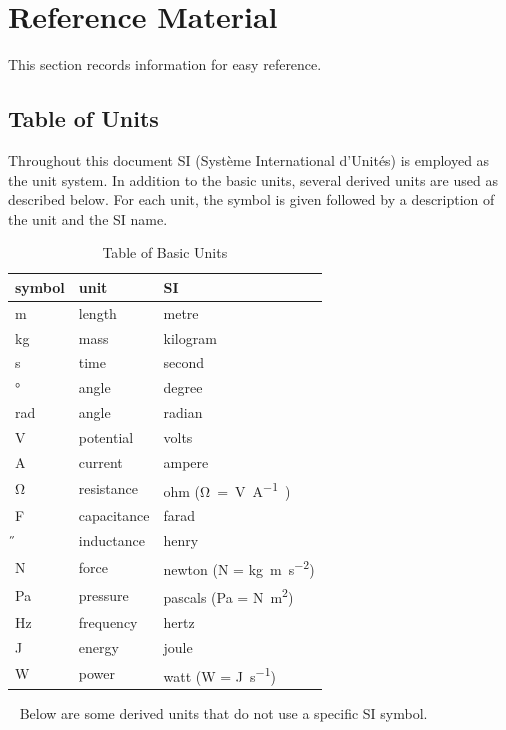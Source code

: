 \documentclass[12pt]{article}
\begin{document}
\section{Reference Material}
\label{Ref_Material}
This section records information for easy reference.

\subsection{Table of Units}

Throughout this document SI (Syst\`{e}me International d'Unit\'{e}s) is employed
as the unit system.  In addition to the basic units, several derived units are
used as described below.  For each unit, the symbol is given followed by a
description of the unit and the SI name.
~\newline

\renewcommand{\arraystretch}{1.2}
	\begin{table}[H]
	\caption{\label{tabUnit}Table of Basic Units}
	  \noindent\begin{tabular}{l l l} 
	    \toprule		
	    \textbf{symbol} & \textbf{unit} & \textbf{SI}\\
	    \midrule 
	    \si{\metre} & length & metre\\
	    \si{\kilogram} & mass	& kilogram\\
	    \si{\second} & time & second\\
	    \si{\degree} & angle & degree\\
	    \si{\radian} & angle & radian\\
	    \si{\V} & potential & volts\\
	    \si{\ampere} & current & ampere\\
	    \si{\ohm} & resistance & ohm (\si\ohm = \si{\V\per\ampere})\\
	    \si{\F} & capacitance & farad\\
	    \si{\H} & inductance & henry\\
	    N & force & newton (N = \si{\kilogram\metre\per\square\second})\\
	    Pa & pressure & pascals (Pa = N\si{\per\square\metre})\\
	    \si{\Hz} & frequency & hertz\\
	    \si{\joule} & energy & joule\\
	    \si{\watt} & power & watt (W = \si{\joule\per\second})\\
	    \bottomrule
	  \end{tabular}

	\end{table}  
  ~\newpage
Below are some derived units that do not use a specific SI symbol.
~\newline
\end{document}
